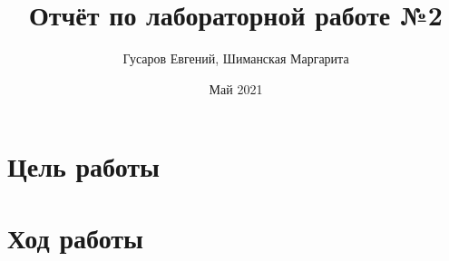 \documentclass{article}
\begin{document}
    \title{%
        Отчёт по лабораторной работе №2 }
    \author{Гусаров Евгений, Шиманская Маргарита}
    \date{Май 2021}
    \maketitle

    \newpage
    \tableofcontents

    \newpage


    \section{Цель работы}\label{sec:цель-работы}
    


    \section{Ход работы}\label{sec:ход-работы}
    
\end{document}

